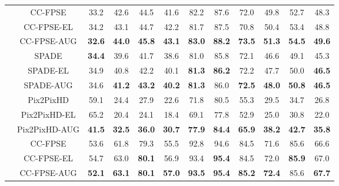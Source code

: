 \documentclass[final]{cvpr}
\newcommand\+{\mkern4mu}
\begin{document}
\begin{table*}[h]
{\begin{tabular}{@{}lc@{\hspace{0.3cm}}c@{\hspace{0.7cm}}ccc@{\hspace{0.7cm}}ccc@{\hspace{0.7cm}}ccc@{}}
\cmidrule(lr){2-12}	
			
			\multirow{9}{*}{  \rotatebox{90}{ADE20K }} & \small \small	CC-FPSE   & \small 33.2 & \small 42.6 & \small 44.5 & \small 41.6 & \small 82.2 & \small 87.6 & \small 72.0 & \small 49.8 & \small 52.7 & \small 48.3 \tabularnewline
			& \small CC-FPSE-EL & \small 34.2 & \small 43.1 & \small 44.7 & \small 42.2 & \small 81.7 & \small 87.5 & \small 70.8 & \small 50.4 & \small 53.4 & \small 48.8 \tabularnewline	
			& \small CC-FPSE-AUG & \small \textbf{32.6} & \small \textbf{44.0} & \small \textbf{45.8} & \small \textbf{43.1} & \small \textbf{83.0} & \small \textbf{88.2} & \small \textbf{73.5} & \small \textbf{51.3} & \small \textbf{54.5} & \small \textbf{49.6} \tabularnewline[0.2cm] 
			
			& \small SPADE & \small \textbf{34.4} & \small 39.6 & \small 41.7 & \small 38.6 & \small 81.0 & \small 85.8 & \small 72.1 & \small 46.6 & \small 49.1 & \small 45.3 \tabularnewline
			& \small SPADE-EL & \small 34.9 & \small 40.8 & \small 42.2 & \small 40.1 & \small \textbf{81.3} & \small \textbf{86.2} & \small 72.2 & \small 47.7 & \small 50.0 & \small \textbf{46.5} \tabularnewline
			& \small SPADE-AUG & \small 34.6 & \small \textbf{41.2} & \small \textbf{43.2} & \small \textbf{40.2} & \small \textbf{81.3} & \small 86.0 & \small \textbf{72.5} & \small \textbf{48.0} & \small \textbf{50.8} & \small \textbf{46.5} \tabularnewline[0.2cm] 
			
			& \small Pix2PixHD & \small 59.1 & \small 24.4 & \small 27.9 & \small 22.6 & \small 71.8 & \small 80.5 & \small 55.3 & \small 29.5 & \small 34.7 & \small 26.8 \tabularnewline
			& \small Pix2PixHD-EL & \small 65.2 & \small 20.4 & \small 24.1 & \small 18.4 & \small 69.1 & \small 77.8 & \small 52.9 & \small 25.0 & \small 30.8 & \small 22.0 \tabularnewline
			& \small Pix2PixHD-AUG & \small \textbf{41.5} & \small \textbf{32.5} & \small \textbf{36.0} & \small \textbf{30.7} & \small \textbf{77.9} & \small \textbf{84.4} & \small \textbf{65.9} & \small \textbf{38.2} & \small \textbf{42.7} & \small \textbf{35.8} \tabularnewline
			


\cmidrule(lr){2-12}  		
			
			\multirow{9}{*}{ \rotatebox{90}{Cityscapes }} & \small CC-FPSE & \small 53.6 & \small 61.8 & \small 79.3 & \small 55.5 & \small 92.8 & \small 94.6 & \small 84.5 & \small 71.6 & \small 85.6 & \small 66.6 \tabularnewline
			& \small CC-FPSE-EL & \small 54.7 & \small	63.0 & \small \textbf{80.1} & \small 56.9 & \small 93.4 & \small \textbf{95.4} & \small 84.5 & \small 72.0 & \small \textbf{85.9} & \small 67.0 \tabularnewline		
			& \small CC-FPSE-AUG & \small \textbf{52.1} & \small \textbf{63.1} & \small \textbf{80.1} & \small \textbf{57.0} & \small \textbf{93.5} & \small \textbf{95.4} & \small \textbf{85.2} & \small \textbf{72.4} & \small 85.6 & \small \textbf{67.7} \tabularnewline[0.2cm]  
			

\end{tabular}}
\end{table*}
\end{document}
